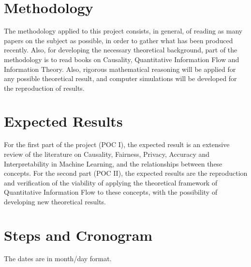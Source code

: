 \documentclass{article}
\begin{document}
\section{Methodology}

The methodology applied to this project consists, in general, of reading as many papers on the subject as possible, in order to gather what has been produced recently. Also, for developing the necessary theoretical background, part of the methodology is to read books on Causality\cite{Causality}\cite{CausalInf}, Quantitative Information Flow\cite{QIF} and Information Theory\cite{InfoTheory}. Also, rigorous mathematical reasoning will be applied for any possible theoretical result, and computer simulations will be developed for the reproduction of results.

\section{Expected Results}

For the first part of the project (POC I), the expected result is an extensive review of the literature on Causality, Fairness, Privacy, Accuracy and Interpretability in Machine Learning, and the relationships between these concepts. For the second part (POC II), the expected results are the reproduction and verification of the viability of applying the theoretical framework of Quantitative Information Flow to these concepts, with the possibility of developing new theoretical results. 

\section{Steps and Cronogram}

The dates are in month/day format.
\end{document}
